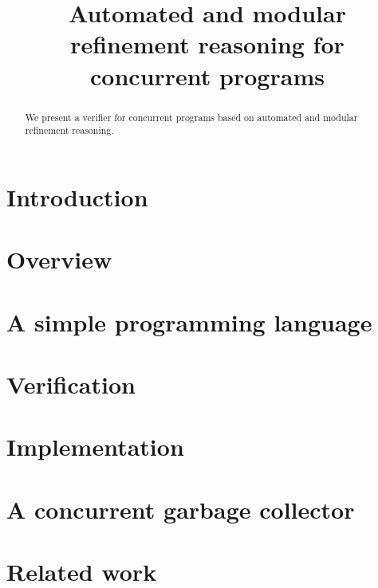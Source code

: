 \documentclass [preprint]{sigplanconf}
\theoremstyle{remark}
\theoremstyle{definition}
\newcommand{\civl}{{\sc civl}\xspace}
\newcommand{\boogie}{{\sc boogie}\xspace}
\newcommand{\zthree}{{\sc Z3}\xspace}
\newcommand{\casm}{{\sc casm}\xspace}
\begin{document}
\setlength{\pdfpageheight}{\paperheight}
\setlength{\pdfpagewidth}{\paperwidth}


\title{Automated and modular refinement reasoning for concurrent programs}
\authorinfo{}{}{}

\maketitle



\begin{abstract}
We present a verifier for concurrent programs based on automated and modular refinement reasoning.  
\end{abstract}

\section{Introduction}
\label{sec:introduction}
% 
\section{Overview}
\label{sec:overview}

\section{A simple programming language}
\label{sec:language}

\section{Verification}
\label{sec:verification}

\section{Implementation}
\label{sec:implementation}
\section{A concurrent garbage collector}
\label{sec:gc}

\section{Related work}
\label{sec:related}
% 



\end{document}
